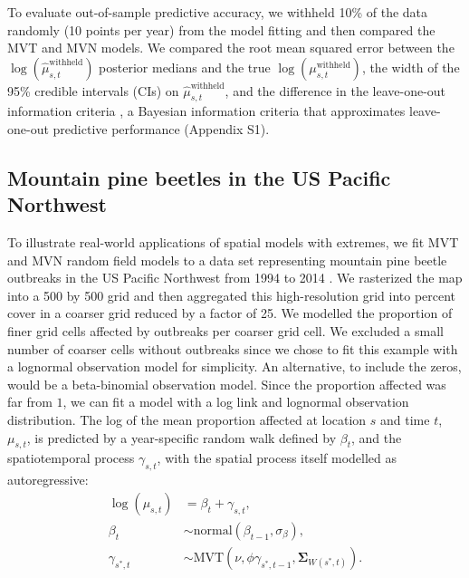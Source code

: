 \documentclass[12pt,english]{article}
\newcommand{\R}[1]{\label{#1}\linelabel{#1}}
\begin{document}
\begin{spacing}{1.8}
To evaluate out-of-sample predictive accuracy, we withheld 10\% of the data
randomly (10 points per year) from the model fitting and then compared the MVT
and MVN models. We compared the root mean squared error between the
$\log(\hat{\mu}^{\mathrm{withheld}}_{s,t})$ posterior medians and the true
$\log\left(\mu^{\mathrm{withheld}}_{s,t}\right)$, the width of the 95\% credible
intervals (CIs) on $\hat{\mu}^{\mathrm{withheld}}_{s,t}$, and the difference in
the leave-one-out information criteria \citep[LOOIC;][]{vehtari2017}, a Bayesian
information criteria that approximates leave-one-out predictive performance
(Appendix S1).

\subsection{Mountain pine beetles in the US Pacific Northwest}
\label{sec:beetles-methods}

To illustrate real-world applications of spatial models with extremes, we fit
MVT and MVN random field models to a data set representing mountain pine beetle
outbreaks in the US Pacific Northwest from 1994 to 2014
\citep{usdaforestservice2017}. We rasterized the map into a 500 by 500 grid and
then aggregated this high-resolution grid into percent cover in a coarser grid
reduced by a factor of 25.
We modelled the proportion of finer grid cells affected by outbreaks per coarser
grid cell.
We excluded a small number of coarser cells without outbreaks
since we chose to fit this example with a lognormal observation model for
simplicity.\R{B16} An alternative, to include the zeros, would be
a beta-binomial observation model.
Since the proportion
affected was far from $1$, we can fit a model with a log link and lognormal
observation distribution.
The log of the mean proportion affected at location
$s$ and time $t$, $\mu_{s,t}$, is predicted by a year-specific random walk
defined by $\beta_t$, and the spatiotemporal process $\gamma_{s,t}$, with the
spatial process itself modelled as autoregressive:
\begin{align} \log(\mu_{s,t}) &= \beta_t + \gamma_{s,t}, \label{eq:beetle-mu} \\
  \beta_t &\sim \mathrm{normal}\left( \beta_{t-1}, \sigma_{\beta} \right), \\
  \gamma_{s^{*},t} &\sim \mathrm{MVT}\left(\nu, \phi \gamma_{s^{*},t-1}, \mathbf{\Sigma}_{W(s^{*},t)}\right).
\end{align}


\end{spacing}
\end{document}
